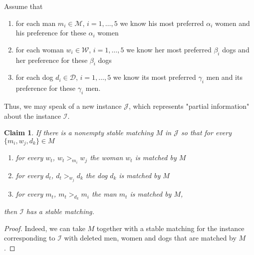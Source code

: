 \documentclass[3p,times]{amsart}
\newtheorem{claim}{Claim}
\begin{document}
Assume that 
\begin{enumerate}
\item for each man $m_i\in \mathcal{M}$, $i=1, \ldots, 5$ we know his most preferred $\alpha_i$ women and his preference for these $\alpha_i$ women

\item for each woman $w_i\in \mathcal{W}$, $i=1, \ldots, 5$ we know her most preferred $\beta_i$ dogs and her preference for these $\beta_i$ dogs

\item for each dog $d_i\in \mathcal{D}$, $i=1, \ldots, 5$ we know its most preferred $\gamma_i$ men and its preference for these $\gamma_i$ men.
\end{enumerate}

Thus, we may speak of a new instance $\mathcal{J}$, which represents "partial information" about the instance $\mathcal{I}$.

\bigskip
\begin{claim}
If there is a nonempty stable matching $M$ in $\mathcal{J}$ so that for every $\{m_i, w_j, d_k\}\in M$
\begin{enumerate}
\item for every $w_t$, $w_t >_{m_i} w_j$ the woman $w_t$ is matched by $M$

\item for every $d_t$, $d_t >_{w_j} d_k$ the dog $d_k$ is matched by $M$

\item for every $m_t$, $m_t >_{d_k} m_i$ the man $m_t$ is matched by $M$,
\end{enumerate}
then $\mathcal{I}$ has  a stable matching. 
\end{claim}
\begin{proof}
Indeed, we can take $M$ together with a stable matching for the instance corresponding to $\mathcal{I}$ with deleted men, women and dogs that are matched by $M$.
\end{proof}
\end{document}
